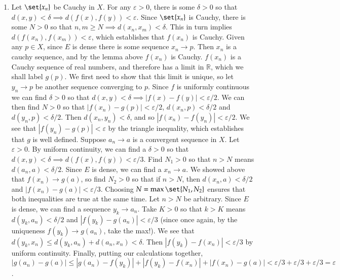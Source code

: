 \documentclass[12pt]{article}
\def\mbb#1{\mathbb{#1}}
\def \R{\mbb{R}}
\def \ve{\varepsilon}
\theoremstyle{definition}
\theoremstyle{remark}
\begin{document}
\begin{enumerate}[leftmargin=\labelsep]
		\item Let $\set{x_n}$ be Cauchy in $X$. For any $\ve > 0$, there is some $\delta > 0$ so that $d(x, y) < \delta \implies d(f(x), f(y)) < \ve$. Since $\set{x_n}$ is Cauchy, there is some $N > 0$ so that $n,m \geq N \implies d(x_n, x_m) < \delta$. This in turn implies $d(f(x_n), f(x_m)) < \ve$, which establishes that $f(x_n)$ is Cauchy. Given any $p \in X$, since $E$ is dense there is some sequence $x_n \to p$. Then $x_n$ is a cauchy sequence, and by the lemma above $f(x_n)$ is Cauchy. $f(x_n)$ is a Cauchy sequence of real numbers, and therefore has a limit in $\R$, which we shall label $g(p)$. We first need to show that this limit is unique, so let $y_n \to p$ be another sequence converging to $p$. Since $f$ is uniformly continuous we can find $\delta > 0$ so that $d(x, y) < \delta \implies |f(x)-f(y)| < \ve/2$. We can then find $N > 0$ so that $|f(x_n) - g(p)| < \ve/2$, $d(x_n, p) < \delta / 2$ and $d(y_n, p) < \delta / 2$. Then $d(x_n, y_n) < \delta$, and so $|f(x_n) - f(y_n)| < \ve/2$. We see that $|f(y_n)-g(p)| < \ve$ by the triangle inequality, which establishes that $g$ is well defined. Suppose $a_n \to a$ is a convergent sequence in $X$. Let $\ve > 0$. By uniform continuity, we can find a $\delta > 0$ so that $d(x,y) < \delta \implies d(f(x), f(y)) < \ve/3$. Find $N_1 > 0$ so that $n > N$ means $d(a_n, a) < \delta/2$. Since $E$ is dense, we can find a $x_n \to a$. We showed above that $f(x_n) \to g(a)$, so find $N_2 > 0$ so that if $n > N$, then $d(x_n, a) < \delta/2$ and $|f(x_n) - g(a)| < \ve/3$. Choosing $N = \max\set{N_1, N_2}$ ensures that both inequalities are true at the same time. Let $n > N$ be arbitrary. Since $E$ is dense, we can find a sequence $y_k \to a_n$. Take $K > 0$ so that $k > K$ means $d(y_k, a_n) < \delta/2$ and $|f(y_k)-g(a_n)| < \ve/3$ (since once again, by the uniqueness $f(y_k) \to g(a_n)$, take the max!). We see that $d(y_k, x_n) \leq d(y_k, a_n) + d(a_n, x_n) < \delta$. Then $|f(y_k) - f(x_n)| < \ve/3$ by uniform continuity. Finally, putting our calculations together, $|g(a_n)-g(a)| \leq |g(a_n)-f(y_k)| + |f(y_k)-f(x_n)|+|f(x_n)-g(a)| < \ve/3 + \ve/3 + \ve/3 = \ve$.
		

\end{enumerate}
\end{document}
